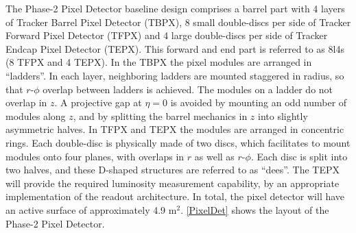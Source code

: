 The Phase-2 Pixel Detector baseline design comprises a barrel part with 4 layers of Tracker Barrel Pixel Detector (TBPX), 8 small double-discs per side of Tracker Forward Pixel Detector (TFPX) and 4 large double-discs per side of Tracker Endcap Pixel Detector (TEPX). This forward and end part is referred to as 8l4s (8 TFPX and 4 TEPX). In the TBPX the pixel modules are arranged in ``ladders''. In each layer, neighboring ladders are mounted staggered in radius, so that $r$-$\phi$ overlap between ladders is achieved. The modules on a ladder do not overlap in $z$. A projective gap at $\eta = 0$ is avoided by mounting an odd number of modules along $z$, and by splitting the barrel mechanics in $z$ into slightly asymmetric halves. In TFPX and TEPX the modules are arranged in concentric rings. Each double-disc is physically made of two discs, which facilitates to mount modules onto four planes, with overlaps in $r$ as well as $r$-$\phi$. Each disc is split into two halves, and these D-shaped structures are referred to as ``dees''. The TEPX will provide the required luminosity measurement capability, by an appropriate implementation of the readout architecture. In total, the pixel detector will have an active surface of approximately 4.9 m$^2$. \autoref{PixelDet} shows the layout of the Phase-2 Pixel Detector.






